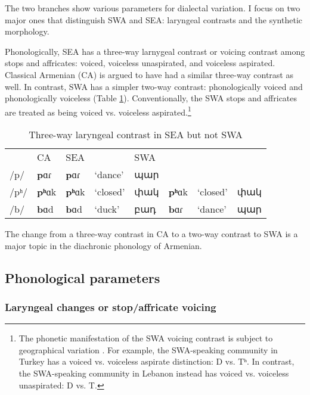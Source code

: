 The two branches show various parameters for dialectal variation. I focus on two major ones that distinguish SWA and SEA: laryngeal contrasts and the synthetic morphology. 


Phonologically, SEA has a three-way larnygeal contrast or voicing contrast among stops and affricates: voiced, voiceless unaspirated, and voiceless aspirated. Classical Armenian (CA) is argued to have had a similar three-way contrast as well. In contrast, SWA has a simpler two-way contrast: phonologically voiced and phonologically voiceless (Table \ref{tab:intro:ea wa differences: phono}). Conventionally, the SWA stops and affricates are treated as being voiced vs. voiceless aspirated.\footnote{The phonetic manifestation of the SWA voicing contrast is subject to geographical variation \citep{kellyKeshishian--2021-VoicingWesternArmenian,Tahtadjian-2021-PhoneticInterferenceProductionStopsWesternArmenianBilingual}.  For example, the SWA-speaking community in Turkey has a voiced vs. voiceless aspirate distinction: D vs. Tʰ. In contrast, the SWA-speaking community in Lebanon  instead has voiced vs. voiceless unaspirated: D vs. T.}

\begin{table}[H]
	\caption{Three-way laryngeal contrast in SEA  but not SWA}
	\label{tab:intro:ea wa differences: phono}
	\centering
	\begin{tabular}{|l|llll| lll|  }
		\hline   	& CA & SEA &   &  SWA & & & 
		\\
		/p/ & \textbf{p}ɑɾ& \textbf{p}ɑɾ  & `dance' & պար & & &  
		\\
		/pʰ/ & \textbf{pʰ}ɑk   & \textbf{pʰ}ɑk   & `closed' &փակ& \textbf{pʰ}ɑk & `closed' & փակ
		\\
		/b/ & \textbf{b}ɑd  & \textbf{b}ɑd  & `duck'  & բադ &  \textbf{b}ɑɾ & `dance'& պար \\ \hline
	\end{tabular}
\end{table}


The change from a three-way contrast in CA to a two-way contrast to SWA is a major topic in the diachronic phonology of Armenian. 
\subsection{Phonological parameters}

\subsubsection{Laryngeal changes or stop/affricate voicing}

